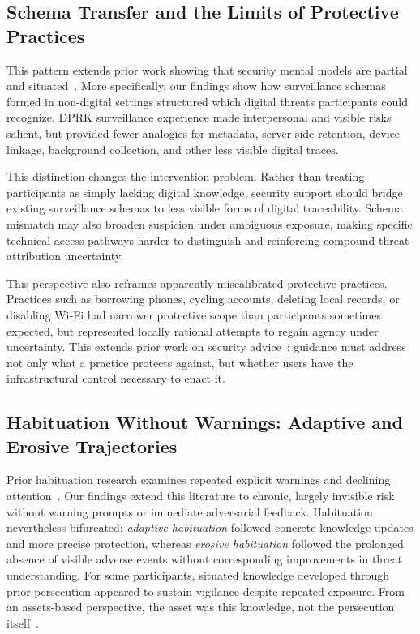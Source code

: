 \documentclass[conference,compsoc]{IEEEtran}
\begin{document}
\subsection{Schema Transfer and the Limits of Protective Practices}

This pattern extends prior work showing that security mental models are partial and situated~\cite{wash2010folk,wash2015too,krombholz2019if}. More specifically, our findings show how surveillance schemas formed in non-digital settings structured which digital threats participants could recognize. DPRK surveillance experience made interpersonal and visible risks salient, but provided fewer analogies for metadata, server-side retention, device linkage, background collection, and other less visible digital traces.

This distinction changes the intervention problem. Rather than treating participants as simply lacking digital knowledge, security support should bridge existing surveillance schemas to less visible forms of digital traceability. Schema mismatch may also broaden suspicion under ambiguous exposure, making specific technical access pathways harder to distinguish and reinforcing compound threat-attribution uncertainty.

This perspective also reframes apparently miscalibrated protective practices. Practices such as borrowing phones, cycling accounts, deleting local records, or disabling Wi-Fi had narrower protective scope than participants sometimes expected, but represented locally rational attempts to regain agency under uncertainty. This extends prior work on security advice~\cite{herley2009so,ion2015no,redmiles2020comprehensive,hielscher2023employees}: guidance must address not only what a practice protects against, but whether users have the infrastructural control necessary to enact it.

\subsection{Habituation Without Warnings: Adaptive and Erosive Trajectories}

Prior habituation research examines repeated explicit warnings and declining attention~\cite{vance2018tuning,anderson2015polymorphic,felt2012android}. Our findings extend this literature to chronic, largely invisible risk without warning prompts or immediate adversarial feedback. Habituation nevertheless bifurcated: \emph{adaptive habituation} followed concrete knowledge updates and more precise protection, whereas \emph{erosive habituation} followed the prolonged absence of visible adverse events without corresponding improvements in threat understanding. For some participants, situated knowledge developed through prior persecution appeared to sustain vigilance despite repeated exposure. From an assets-based perspective, the asset was this knowledge, not the persecution itself~\cite{wongvillacres2020culture,wongvillacres2022elevating}.
\end{document}

